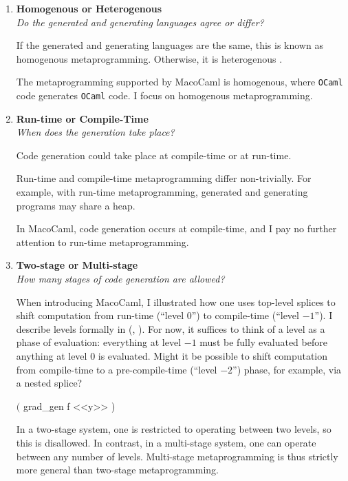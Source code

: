 \begin{enumerate}
  \item \textbf{\textsf{Homogenous or Heterogenous}}\\
         \textit{Do the generated and generating languages agree or differ?}
  
        If the generated and generating languages are the same, this is known as {homogenous} metaprogramming. Otherwise, it is {heterogenous} \citep{kiselyov-2024}.

        The metaprogramming supported by MacoCaml is homogenous, where \texttt{OCaml} code generates \texttt{OCaml} code. I focus on homogenous metaprogramming.

  \item \textbf{\textsf{Run-time or Compile-Time}} \\
        \textit{When does the generation take place?}

        Code generation could take place at compile-time or at run-time.

        
        Run-time and compile-time metaprogramming differ non-trivially. For example, with run-time metaprogramming, generated and generating programs may share a heap. 

        In MacoCaml, code generation occurs at compile-time, and I pay no further attention to run-time metaprogramming.
        
  \item \textbf{\textsf{Two-stage or Multi-stage}} \\
  \textit{How many stages of code generation are allowed?}

  When introducing MacoCaml, I illustrated how one uses top-level splices to shift computation from run-time (``level $0$'') to compile-time (``level $-1$''). I describe levels formally in  (, ). For now, it suffices to think of a level as a phase of evaluation: everything at level $-1$ must be fully evaluated before anything at level $0$ is evaluated. Might it be possible to shift computation from compile-time to a pre-compile-time (``level $-2$'') phase, for example, via a nested splice?
  \begin{macocaml}
$($ grad_gen f <<y>> )
  \end{macocaml}
  In a two-stage system, one is restricted to operating between two levels, so this is disallowed. In contrast, in a multi-stage system, one can operate between any number of levels. Multi-stage metaprogramming is thus strictly more general than two-stage metaprogramming.
  

\end{enumerate}
